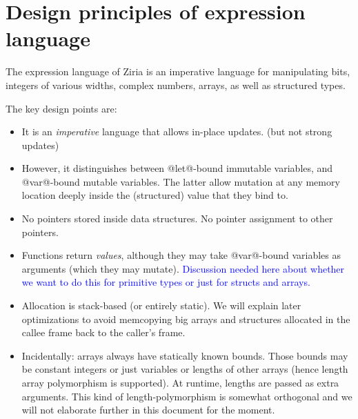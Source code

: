 \documentclass[nocopyrightspace,preprint,onecolumn,10pt]{sigplanconf}  %
\theoremstyle{remark}
\theoremstyle{definition}
\theoremstyle{plain}
\newcommand{\authornote}[3]{\marginpar{\sc\color{#2} #1}\textcolor{#2}{#3}}
\newcommand\dv[1]{\authornote{dv}{blue}{#1}}
\begin{document}



\section{Design principles of expression language}

The expression language of Ziria is an imperative language for
manipulating bits, integers of various widths, complex numbers,
arrays, as well as structured types.

The key design points are:
\begin{itemize}

   \item It is an {\em imperative} language that allows in-place
     updates. (but not strong updates)

   \item However, it distinguishes between @let@-bound immutable
     variables, and @var@-bound mutable variables. The latter allow
     mutation at any memory location deeply inside the (structured)
     value that they bind to.

   \item No pointers stored inside data structures. No pointer
     assignment to other pointers.

   \item Functions return {\em values}, although they may take
     @var@-bound variables as arguments (which they may mutate).
     \dv{Discussion needed here about whether we want to do this for
       primitive types or just for structs and arrays.}
 
   \item Allocation is stack-based (or entirely static). We will
     explain later optimizations to avoid memcopying big arrays and
     structures allocated in the callee frame back to the caller's
     frame.

   \item Incidentally: arrays always have statically known
     bounds. Those bounds may be constant integers or just variables
     or lengths of other arrays (hence length array polymorphism is
     supported).  At runtime, lengths are passed as extra
     arguments. This kind of length-polymorphism is somewhat
     orthogonal and we will not elaborate further in this document for
     the moment.
\end{itemize}
\end{document}
